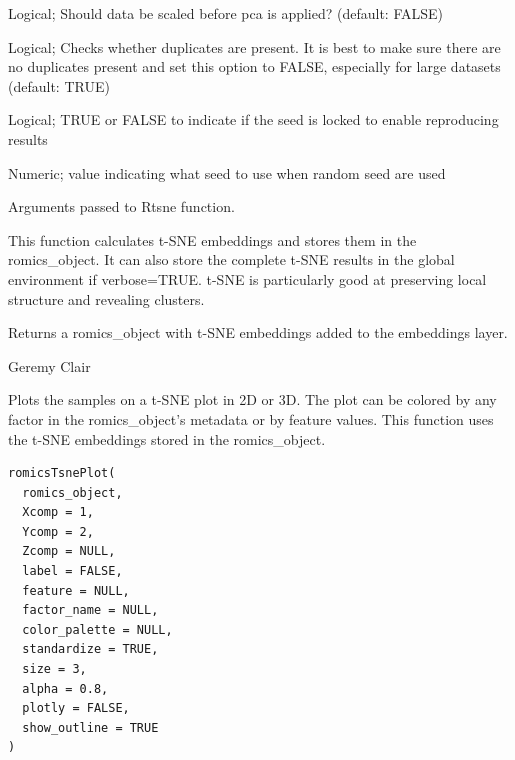 \documentclass[a4paper]{book}
\begin{document}
\begin{Arguments}
\begin{ldescription}
\item[\code{pca\_scale}] Logical; Should data be scaled before pca is applied? (default: FALSE)

\item[\code{check\_duplicates}] Logical; Checks whether duplicates are present. It is best to make sure there are no duplicates present and set this option to FALSE, especially for large datasets (default: TRUE)

\item[\code{lock.seed}] Logical; TRUE or FALSE to indicate if the seed is locked to enable reproducing results

\item[\code{seed}] Numeric; value indicating what seed to use when random seed are used

\item[\code{...}] Arguments passed to Rtsne function.
\end{ldescription}
\end{Arguments}
%
\begin{Details}
This function calculates t-SNE embeddings and stores them in the romics\_object. It can also store the complete
t-SNE results in the global environment if verbose=TRUE. t-SNE is particularly good at preserving local structure and revealing clusters.
\end{Details}
%
\begin{Value}
Returns a romics\_object with t-SNE embeddings added to the embeddings layer.
\end{Value}
%
\begin{Author}
Geremy Clair
\end{Author}
%
\begin{Description}
Plots the samples on a t-SNE plot in 2D or 3D.
The plot can be colored by any factor in the romics\_object's metadata or by feature values.
This function uses the t-SNE embeddings stored in the romics\_object.
\end{Description}
%
\begin{Usage}
\begin{verbatim}
romicsTsnePlot(
  romics_object,
  Xcomp = 1,
  Ycomp = 2,
  Zcomp = NULL,
  label = FALSE,
  feature = NULL,
  factor_name = NULL,
  color_palette = NULL,
  standardize = TRUE,
  size = 3,
  alpha = 0.8,
  plotly = FALSE,
  show_outline = TRUE
)
\end{verbatim}
\end{Usage}
%
\end{document}
